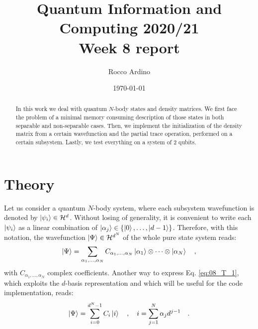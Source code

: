 \documentclass[pra, onecolumn, notitlepage, floats, 11pt]{revtex4-1}
\begin{document}
\title{Quantum Information and Computing 2020/21\\Week 8 report}

\author{Rocco Ardino}

\date{\today}





\begin{abstract}
    In this work we deal with quantum \( N \)-body states and density matrices. We first face the problem of a minimal memory consuming description of those states in both separable and non-separable cases. Then, we implement the initialization of the density matrix from a certain wavefunction and the partial trace operation, performed on a certain subsystem. Lastly, we test everything on a system of 2 qubits.
\end{abstract}

\maketitle





\section{Theory}
Let us consider a quantum \( N \)-body system, where each subsystem wavefunction is denoted by \( \ket{\psi_{i}} \in \mathcal{H}^{d} \). Without losing of generality, it is convenient to write each \( \ket{\psi_{i}} \) as a linear combination of \( \ket{\alpha_{j}} \in \qty{\ket{0},\dots,\ket{d-1}} \).
Therefore, with this notation, the wavefunction \( \ket{\Psi} \in \mathcal{H}^{d^{N}} \) of the whole pure state system reads:
\begin{equation}
    \ket{\Psi}
    =
    \sum_{\alpha_{1},\dots,\alpha_{N}}
    C_{\alpha_{1},\dots,\alpha_{N}}
    \ket{\alpha_{1}}
    \otimes
    \cdots
    \otimes
    \ket{\alpha_{N}}
    \quad ,
    \label{eq:08_T_1}
\end{equation}
with \( C_{\alpha_{1},\dots,\alpha_{N}} \) complex coefficients. Another way to express Eq. \ref{eq:08_T_1}, which exploits the \( d \)-basis representation and which will be useful for the code implementation, reads:
\begin{equation}
    \ket{\Psi}
    =
    \sum_{i=0}^{d^{N}-1} C_{i} \ket{i}
    \quad , \quad
    i
    =
    \sum_{j=1}^{N} \alpha_{j} d^{j-1}
    \quad .
    \label{eq:08_T_2}
\end{equation}
\end{document}
